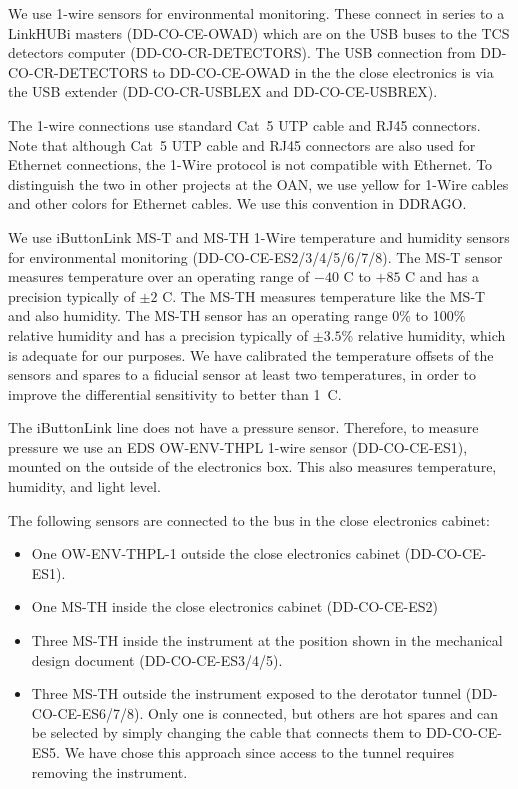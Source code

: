 \documentclass{article}
\begin{document}
We use 1-wire sensors for environmental monitoring. These connect in series to a LinkHUBi masters (DD-CO-CE-OWAD) which are on the USB buses to the TCS detectors computer (DD-CO-CR-DETECTORS). The USB connection from DD-CO-CR-DETECTORS to DD-CO-CE-OWAD in the the close electronics is via the USB extender (DD-CO-CR-USBLEX and DD-CO-CE-USBREX).

The 1-wire connections use standard Cat~5 UTP cable and RJ45 connectors. Note that although Cat~5 UTP cable and RJ45 connectors are also used for Ethernet connections, the 1-Wire protocol is not compatible with Ethernet. To distinguish the two in other projects at the OAN, we use yellow for 1-Wire cables and other colors for Ethernet cables. We use this convention in DDRAGO.

We use iButtonLink MS-T and MS-TH 1-Wire temperature and humidity sensors for environmental monitoring (DD-CO-CE-ES2/3/4/5/6/7/8). The MS-T sensor measures temperature over an operating range of $-40$ C to $+85$ C and has a precision typically of $\pm 2$ C. The MS-TH measures temperature like the MS-T and also humidity. The MS-TH sensor has an operating range 0\% to 100\% relative humidity and has a precision typically of $\pm 3.5\%$ relative humidity, which is adequate for our purposes. We have calibrated the temperature offsets of the sensors and spares to a fiducial sensor at least two temperatures, in order to improve the differential sensitivity to better than 1~C.

The iButtonLink line does not have a pressure sensor. Therefore, to measure pressure we use an EDS OW-ENV-THPL 1-wire sensor (DD-CO-CE-ES1), mounted on the outside of the electronics box. This also measures temperature, humidity, and light level.

The following sensors are connected to the bus in the close electronics cabinet:
\begin{itemize}
\item One OW-ENV-THPL-1 outside the close electronics cabinet (DD-CO-CE-ES1).
\item One MS-TH inside the close electronics cabinet (DD-CO-CE-ES2)
\item Three MS-TH inside the instrument at the position shown in the mechanical design document (DD-CO-CE-ES3/4/5).
\item Three MS-TH outside the instrument exposed to the derotator tunnel (DD-CO-CE-ES6/7/8). Only one is connected, but others are hot spares and can be selected by simply changing the cable that connects them to DD-CO-CE-ES5. We have chose this approach since access to the tunnel requires removing the instrument.
\end{itemize}
\end{document}
